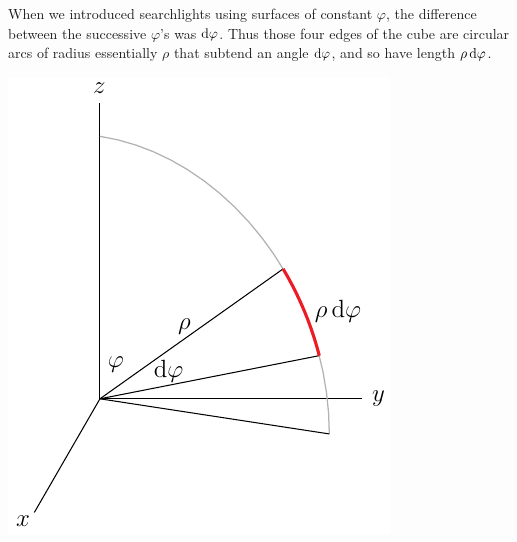 \begin{itemize}
\begin{efig}
\begin{center}
\end{center}
\end{efig}
When we introduced searchlights using surfaces of constant $\varphi$, 
the difference between the successive $\varphi$'s was $\mathrm{d}\varphi$. 
Thus those four edges of the cube are circular arcs of radius 
essentially $\rho$ that subtend an angle $\mathrm{d}\varphi$, and so have length $\rho\,\mathrm{d}\varphi$.
\begin{efig}
\begin{center}
    \includegraphics[scale=0.8]{figures/coord/spher9.pdf}
\end{center}
\end{efig}


\end{itemize}
